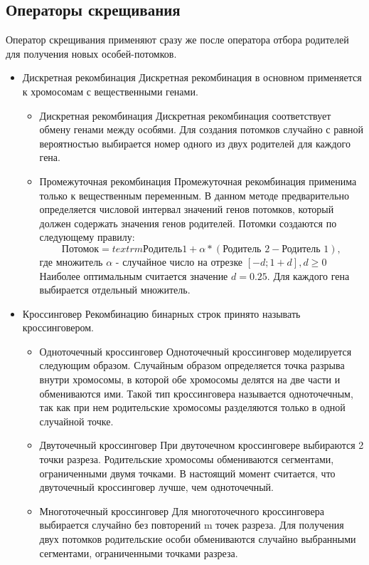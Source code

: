 \begin{itemize}
\section{Операторы скрещивания}
Оператор скрещивания применяют сразу же после оператора отбора родителей для получения новых особей-потомков.
\begin{itemize}[label=$\ast$]
	\item Дискретная рекомбинация
Дискретная рекомбинация в основном применяется к хромосомам с вещественными генами.
	\begin{itemize}[label=$-$]
		\item Дискретная рекомбинация
Дискретная рекомбинация соответствует обмену генами между особями. Для создания потомков случайно с равной вероятностью выбирается номер одного из двух родителей для каждого гена.
		\item Промежуточная рекомбинация
Промежуточная рекомбинация применима только к вещественным переменным. В данном методе предварительно определяется числовой интервал значений генов потомков, который должен содержать значения генов родителей. Потомки создаются по следующему правилу:
\begin{equation}
	\textrm{Потомок} = textrm{Родитель 1} + \alpha \ast (\textrm{Родитель 2} - \textrm{Родитель 1}),
\end{equation}
где множитель $\alpha$ - случайное число на отрезке $[-d; 1 + d], d \geq 0$
Наиболее оптимальным считается значение $d = 0.25$. Для каждого гена выбирается отдельный множитель. 
	\end{itemize}
	\item Кроссинговер
Рекомбинацию бинарных строк принято называть кроссинговером.
	\begin{itemize}[label=$-$]
		\item Одноточечный кроссинговер
Одноточечный кроссинговер моделируется следующим образом. Случайным образом определяется точка разрыва внутри хромосомы, в которой обе хромосомы делятся на две части и обмениваются ими. Такой тип кроссинговера называется одноточечным, так как при нем родительские хромосомы разделяются только в одной случайной точке.
		\item Двуточечный кроссинговер
При двуточечном кроссинговере выбираются 2 точки разреза. Родительские хромосомы обмениваются сегментами, ограниченными двумя точками. В настоящий момент считается, что двуточечный кроссинговер лучше, чем одноточечный.
		\item Многоточечный кроссинговер
Для многоточечного кроссинговера выбирается случайно без повторений m точек разреза. Для получения двух потомков родительские особи обмениваются случайно выбранными сегментами, ограниченными точками разреза.
	\end{itemize}
\end{itemize}


\end{itemize}
